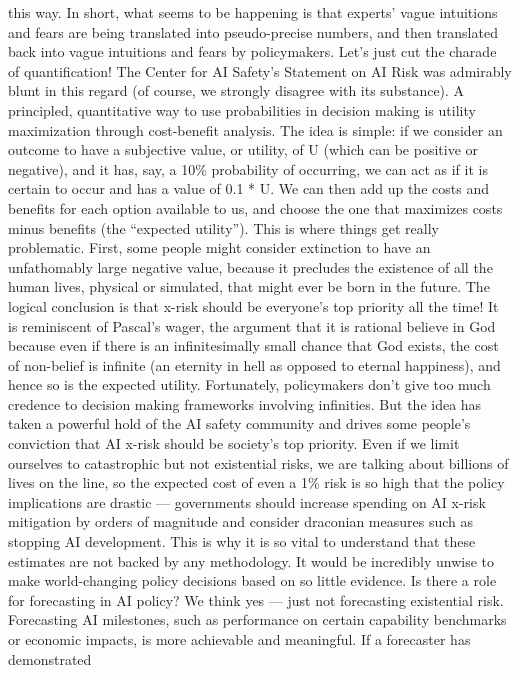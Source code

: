 this way.
In short, what seems to be happening is that experts’ vague intuitions
and fears are being translated into pseudo-precise numbers, and
then translated back into vague intuitions and fears by policymakers.
Let’s just cut the charade of quantiﬁcation! The Center for AI Safety’s
Statement on AI Risk was admirably blunt in this regard (of course,
we strongly disagree with its substance).
A principled, quantitative way to use probabilities in decision making
is utility maximization through cost-beneﬁt analysis. The idea is
simple: if we consider an outcome to have a subjective value, or
utility, of U (which can be positive or negative), and it has, say, a 10\%
probability of occurring, we can act as if it is certain to occur and has
a value of 0.1 * U. We can then add up the costs and beneﬁts for
each option available to us, and choose the one that maximizes
costs minus beneﬁts (the “expected utility”).
This is where things get really problematic. First, some people might
consider extinction to have an unfathomably large negative value,
because it precludes the existence of all the human lives, physical or
simulated, that might ever be born in the future. The logical
conclusion is that x-risk should be everyone’s top priority all the time!
It is reminiscent of Pascal’s wager, the argument that it is rational
believe in God because even if there is an inﬁnitesimally small
chance that God exists, the cost of non-belief is inﬁnite (an eternity in
hell as opposed to eternal happiness), and hence so is the expected
utility. Fortunately, policymakers don’t give too much credence to
decision making frameworks involving inﬁnities. But the idea has
taken a powerful hold of the AI safety community and drives some
people’s conviction that AI x-risk should be society’s top priority.
Even if we limit ourselves to catastrophic but not existential risks, we
are talking about billions of lives on the line, so the expected cost of
even a 1\% risk is so high that the policy implications are drastic —
governments should increase spending on AI x-risk mitigation by
orders of magnitude and consider draconian measures such as
stopping AI development. This is why it is so vital to understand that
these estimates are not backed by any methodology. It would be
incredibly unwise to make world-changing policy decisions based on
so little evidence.
Is there a role for forecasting in AI policy? We think yes — just not
forecasting existential risk. Forecasting AI milestones, such as
performance on certain capability benchmarks or economic impacts,
is more achievable and meaningful. If a forecaster has demonstrated
